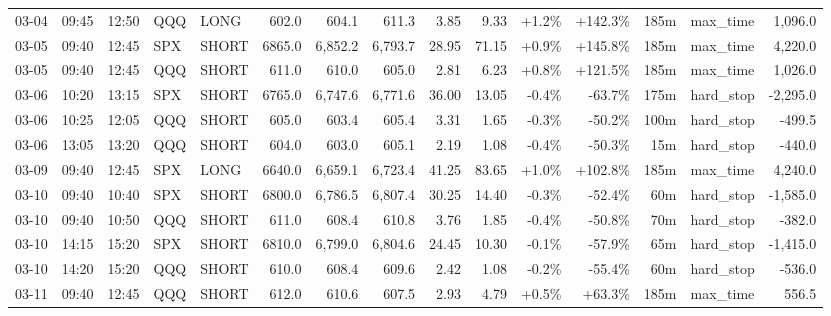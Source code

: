 \documentclass[11pt,a4paper,twoside]{article}
\begin{document}
\begin{landscape}
\begin{center}
\begin{longtable}{>{\color{txtmain}}l l l l l r r r r r r r r >{\color{txtmain}}l r}
03-04 & 09:45 & 12:50 & QQQ & LONG & 602.0 & 604.1 & 611.3 & 3.85 & 9.33 & \textcolor{wingreen}{+1.2\%} & \textcolor{wingreen}{+142.3\%} & 185m & max\_time & \textcolor{wingreen}{1,096.0} \\
03-05 & 09:40 & 12:45 & SPX & SHORT & 6865.0 & 6,852.2 & 6,793.7 & 28.95 & 71.15 & \textcolor{wingreen}{+0.9\%} & \textcolor{wingreen}{+145.8\%} & 185m & max\_time & \textcolor{wingreen}{4,220.0} \\
03-05 & 09:40 & 12:45 & QQQ & SHORT & 611.0 & 610.0 & 605.0 & 2.81 & 6.23 & \textcolor{wingreen}{+0.8\%} & \textcolor{wingreen}{+121.5\%} & 185m & max\_time & \textcolor{wingreen}{1,026.0} \\
03-06 & 10:20 & 13:15 & SPX & SHORT & 6765.0 & 6,747.6 & 6,771.6 & 36.00 & 13.05 & \textcolor{lossred}{-0.4\%} & \textcolor{lossred}{-63.7\%} & 175m & hard\_stop & \textcolor{lossred}{-2,295.0} \\
03-06 & 10:25 & 12:05 & QQQ & SHORT & 605.0 & 603.4 & 605.4 & 3.31 & 1.65 & \textcolor{lossred}{-0.3\%} & \textcolor{lossred}{-50.2\%} & 100m & hard\_stop & \textcolor{lossred}{-499.5} \\
03-06 & 13:05 & 13:20 & QQQ & SHORT & 604.0 & 603.0 & 605.1 & 2.19 & 1.08 & \textcolor{lossred}{-0.4\%} & \textcolor{lossred}{-50.3\%} & 15m & hard\_stop & \textcolor{lossred}{-440.0} \\
03-09 & 09:40 & 12:45 & SPX & LONG & 6640.0 & 6,659.1 & 6,723.4 & 41.25 & 83.65 & \textcolor{wingreen}{+1.0\%} & \textcolor{wingreen}{+102.8\%} & 185m & max\_time & \textcolor{wingreen}{4,240.0} \\
03-10 & 09:40 & 10:40 & SPX & SHORT & 6800.0 & 6,786.5 & 6,807.4 & 30.25 & 14.40 & \textcolor{lossred}{-0.3\%} & \textcolor{lossred}{-52.4\%} & 60m & hard\_stop & \textcolor{lossred}{-1,585.0} \\
03-10 & 09:40 & 10:50 & QQQ & SHORT & 611.0 & 608.4 & 610.8 & 3.76 & 1.85 & \textcolor{lossred}{-0.4\%} & \textcolor{lossred}{-50.8\%} & 70m & hard\_stop & \textcolor{lossred}{-382.0} \\
03-10 & 14:15 & 15:20 & SPX & SHORT & 6810.0 & 6,799.0 & 6,804.6 & 24.45 & 10.30 & \textcolor{lossred}{-0.1\%} & \textcolor{lossred}{-57.9\%} & 65m & hard\_stop & \textcolor{lossred}{-1,415.0} \\
03-10 & 14:20 & 15:20 & QQQ & SHORT & 610.0 & 608.4 & 609.6 & 2.42 & 1.08 & \textcolor{lossred}{-0.2\%} & \textcolor{lossred}{-55.4\%} & 60m & hard\_stop & \textcolor{lossred}{-536.0} \\
03-11 & 09:40 & 12:45 & QQQ & SHORT & 612.0 & 610.6 & 607.5 & 2.93 & 4.79 & \textcolor{wingreen}{+0.5\%} & \textcolor{wingreen}{+63.3\%} & 185m & max\_time & \textcolor{wingreen}{556.5} \\

\end{longtable}
\end{center}
\end{landscape}
\end{document}

